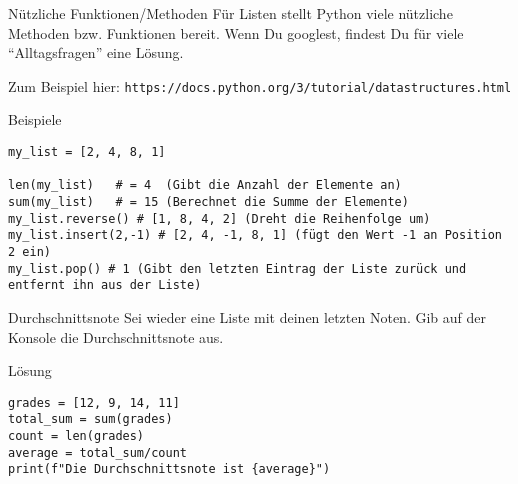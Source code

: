 \begin{fragile}
\begin{block}{Nützliche Funktionen/Methoden}
\vspace{2pt}	
Für Listen stellt Python viele nützliche Methoden bzw. Funktionen bereit. Wenn Du googlest, findest Du für viele \enquote{Alltagsfragen} eine Lösung. 

Zum Beispiel hier: \texttt{https://docs.python.org/3/tutorial/datastructures.html}
\end{block}

\pause
\vspace{12pt}


\begin{exampleblock}{Beispiele}
\begin{verbatim}
my_list = [2, 4, 8, 1]

len(my_list)   # = 4  (Gibt die Anzahl der Elemente an)
sum(my_list)   # = 15 (Berechnet die Summe der Elemente)
my_list.reverse() # [1, 8, 4, 2] (Dreht die Reihenfolge um)
my_list.insert(2,-1) # [2, 4, -1, 8, 1] (fügt den Wert -1 an Position 2 ein)
my_list.pop() # 1 (Gibt den letzten Eintrag der Liste zurück und entfernt ihn aus der Liste)
\end{verbatim}
\end{exampleblock}
\end{fragile}


\begin{fragile}[Übung]

\begin{block}{Durchschnittsnote}
\vspace{2pt}
Sei  wieder eine Liste mit deinen letzten Noten.  Gib auf der Konsole die Durchschnittsnote aus. 
\end{block}	

\vspace{12pt}

\begin{solutionblock}{Lösung}
\begin{verbatim}
grades = [12, 9, 14, 11]
total_sum = sum(grades)
count = len(grades)
average = total_sum/count
print(f"Die Durchschnittsnote ist {average}")
\end{verbatim}
\end{solutionblock}
	
\end{fragile}

